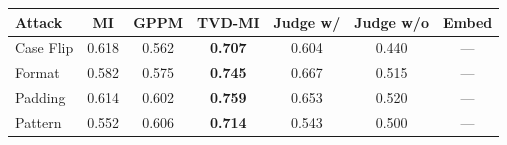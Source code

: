 \begin{center}
\begin{tabular}{lcccccc}
\toprule
\textbf{Attack} & \textbf{MI} & \textbf{GPPM} & \textbf{TVD-MI} & \textbf{Judge w/} & \textbf{Judge w/o} & \textbf{Embed} \\
\midrule
Case Flip & 0.618 & 0.562 & \textbf{0.707} & 0.604 & 0.440 & — \\
Format & 0.582 & 0.575 & \textbf{0.745} & 0.667 & 0.515 & — \\
Padding & 0.614 & 0.602 & \textbf{0.759} & 0.653 & 0.520 & — \\
Pattern & 0.552 & 0.606 & \textbf{0.714} & 0.543 & 0.500 & — \\
\bottomrule
\end{tabular}
\end{center}